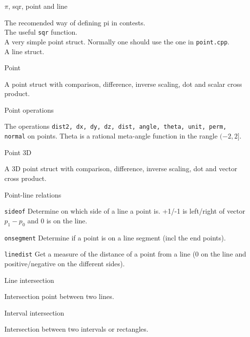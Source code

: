 \begin{algorithm}{$\pi$, sqr, point and line}

\desc
The recomended way of defining pi in contests. \\
The useful {\tt sqr} function. \\
A very simple point struct.
Normally one should use the one in {\tt point.cpp}. \\
A line struct.
\end{algorithm}

\begin{algorithm}{Point}

\desc
A point struct with comparison, difference, inverse scaling, dot and
scalar cross product.
\end{algorithm}

\begin{algorithm}{Point operations}

\desc
The operations {\tt dist2, dx, dy, dz, dist, angle, theta, unit, perm, normal}
on points. Theta is a rational meta-angle function in the rangle $(-2,2]$.
\end{algorithm}

\begin{algorithm}{Point 3D}

\desc
A 3D point struct with comparison, difference, inverse scaling, dot and
vector cross product.
\end{algorithm}

\begin{algorithm}{Point-line relations}
\item[{\tt sideof}] Determine on which side of a line a point is.
+1/-1 is left/right of vector $p_1-p_0$ and 0 is on the line.
\item[{\tt onsegment}] Determine if a point is on a line segment (incl the end
points).
\item[{\tt linedist}] Get a measure of the distance of a point from a line
(0 on the line and positive/negative on the different sides).
\end{algorithm}

\begin{algorithm}{Line intersection}

\desc
Intersection point between two lines.
\end{algorithm}

\begin{algorithm}{Interval intersection}

\desc
Intersection between two intervals or rectangles.
\end{algorithm}

